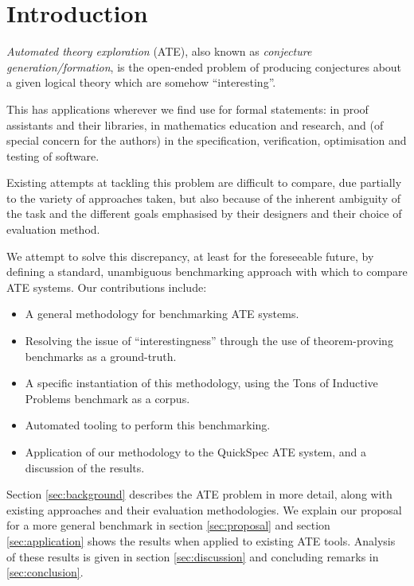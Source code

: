 \section{Introduction}
\label{intro}


\emph{Automated theory exploration} (ATE), also known as
\emph{conjecture generation/formation}, is the open-ended problem of producing
conjectures about a given logical theory which are somehow ``interesting''.

This has applications wherever we find use for formal statements: in proof
assistants and their libraries, in mathematics education and research, and
(of special concern for the authors) in the specification, verification,
optimisation and testing of software.

Existing attempts at tackling this problem are difficult to compare, due
partially to the variety of approaches taken, but also because of the inherent
ambiguity of the task and the different goals emphasised by their designers and
their choice of evaluation method.

We attempt to solve this discrepancy, at least for the foreseeable future, by
defining a standard, unambiguous benchmarking approach with which to compare
ATE systems. Our contributions include:

\begin{itemize}
\item A general methodology for benchmarking ATE systems.
\item Resolving the issue of ``interestingness'' through the use of
  theorem-proving benchmarks as a ground-truth.
\item A specific instantiation of this methodology, using the Tons of Inductive
  Problems benchmark as a corpus.
\item Automated tooling to perform this benchmarking.
\item Application of our methodology to the QuickSpec ATE system, and a
  discussion of the results.
\end{itemize}

Section \ref{sec:background} describes the ATE problem in more detail, along
with existing approaches and their evaluation methodologies. We explain our
proposal for a more general benchmark in section \ref{sec:proposal} and
section \ref{sec:application} shows the results when applied to existing ATE
tools. Analysis of these results is given in section \ref{sec:discussion} and
concluding remarks in \ref{sec:conclusion}.

